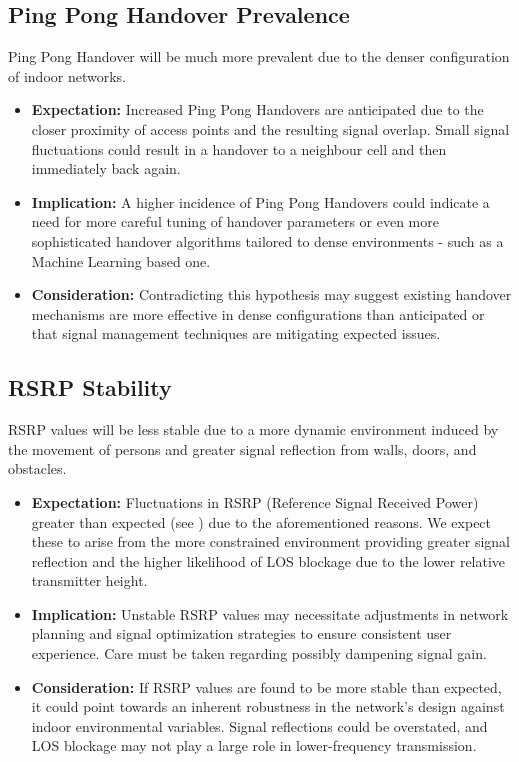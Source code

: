 \subsection{Ping Pong Handover Prevalence}
Ping Pong Handover will be much more prevalent due to the denser configuration of indoor networks.
\begin{itemize}
    \item \textbf{Expectation:} Increased Ping Pong Handovers are anticipated due to the closer proximity of access points and the resulting signal overlap. Small signal fluctuations could result in a handover to a neighbour cell and then immediately back again.
    \item \textbf{Implication:} A higher incidence of Ping Pong Handovers could indicate a need for more careful tuning of handover parameters or even more sophisticated handover algorithms tailored to dense environments - such as a Machine Learning based one.
    \item \textbf{Consideration:} Contradicting this hypothesis may suggest existing handover mechanisms are more effective in dense configurations than anticipated or that signal management techniques are mitigating expected issues.
\end{itemize}

\subsection{RSRP Stability}
RSRP values will be less stable due to a more dynamic environment induced by the movement of persons and greater signal reflection from walls, doors, and obstacles.
\begin{itemize}
    \item \textbf{Expectation:} Fluctuations in RSRP (Reference Signal Received Power) greater than expected (see \insertref) due to the aforementioned reasons. We expect these to arise from the more constrained environment providing greater signal reflection and the higher likelihood of LOS blockage due to the lower relative transmitter height.
    \item \textbf{Implication:} Unstable RSRP values may necessitate adjustments in network planning and signal optimization strategies to ensure consistent user experience. Care must be taken regarding possibly dampening signal gain.
    \item \textbf{Consideration:} If RSRP values are found to be more stable than expected, it could point towards an inherent robustness in the network's design against indoor environmental variables. Signal reflections could be overstated, and LOS blockage may not play a large role in lower-frequency transmission.
\end{itemize}

